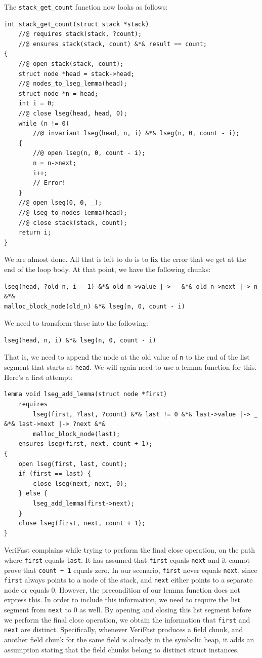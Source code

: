 \documentclass{article}
\begin{document}
The \lstinline!stack_get_count! function now looks as follows:
\begin{lstlisting}
int stack_get_count(struct stack *stack)
    //@ requires stack(stack, ?count);
    //@ ensures stack(stack, count) &*& result == count;
{
    //@ open stack(stack, count);
    struct node *head = stack->head;
    //@ nodes_to_lseg_lemma(head);
    struct node *n = head;
    int i = 0;
    //@ close lseg(head, head, 0);
    while (n != 0)
        //@ invariant lseg(head, n, i) &*& lseg(n, 0, count - i);
    {
        //@ open lseg(n, 0, count - i);
        n = n->next;
        i++;
        // Error!
    }
    //@ open lseg(0, 0, _);
    //@ lseg_to_nodes_lemma(head);
    //@ close stack(stack, count);
    return i;
}
\end{lstlisting}
We are almost done. All that is left to do is to fix the error
that we get at the end of the loop body. At that point, we have
the following chunks:
\begin{lstlisting}
lseg(head, ?old_n, i - 1) &*& old_n->value |-> _ &*& old_n->next |-> n &*&
malloc_block_node(old_n) &*& lseg(n, 0, count - i)
\end{lstlisting}
We need to transform these into the following:
\begin{lstlisting}
lseg(head, n, i) &*& lseg(n, 0, count - i)
\end{lstlisting}
That is, we need to append the node at the old value of
\lstinline!n! to the end of the list segment that starts at
\lstinline!head!. We will again need to use a lemma function
for this. Here's a first attempt:
\begin{lstlisting}
lemma void lseg_add_lemma(struct node *first)
    requires
        lseg(first, ?last, ?count) &*& last != 0 &*& last->value |-> _ &*& last->next |-> ?next &*&
        malloc_block_node(last);
    ensures lseg(first, next, count + 1);
{
    open lseg(first, last, count);
    if (first == last) {
        close lseg(next, next, 0);
    } else {
        lseg_add_lemma(first->next);
    }
    close lseg(first, next, count + 1);
}
\end{lstlisting}
VeriFast complains while trying to perform the final close
operation, on the path where \lstinline!first! equals
\lstinline!last!. It has assumed that \lstinline!first! equals
\lstinline!next! and it cannot prove that \lstinline!count + 1!
equals zero. In our scenario, \lstinline!first! never equals
\lstinline!next!, since \lstinline!first! always points to a
node of the stack, and \lstinline!next! either points to a
separate node or equals 0. However, the precondition of our
lemma function does not express this. In order to include this
information, we need to require the list segment from
\lstinline!next! to 0 as well. By opening and closing this list
segment before we perform the final close operation, we obtain
the information that \lstinline!first! and \lstinline!next! are
distinct. Specifically, whenever VeriFast produces a field
chunk, and another field chunk for the same field is already in
the symbolic heap, it adds an assumption stating that the field
chunks belong to distinct struct instances.
\end{document}
